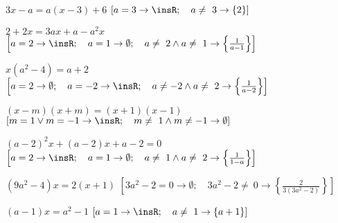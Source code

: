 \begin{esercizio}[\Ast]
\begin{enumeratea}
% 
 \item $3x-a=a(x-3)+6$
\hfill $\left[a=3 \rightarrow \insR; \quad a\neq~3 \rightarrow \{2\}\right]$
 \item $2+2x=3ax+a-a^{2}x$
\hfill $\left[a=2 \rightarrow \insR; \quad 
a=1 \rightarrow \emptyset; \quad 
a\neq~2\wedge a\neq~1 \rightarrow \left\{\frac{1}{a-1}\right\}\right]$
 \item $x(a^{2}-4)=a+2$
\hfill $\left[a=2 \rightarrow \emptyset; \quad 
a=-2 \rightarrow \insR; \quad 
a\neq -2\wedge a\neq~2 \rightarrow \left\{\frac{1}{a-2}\right\}\right]$
 \item $(x-m)(x+m)=(x+1)(x-1)$
\hfill $\left[m=1\vee m=-1 \rightarrow \insR; \quad 
m\neq~1\wedge m\neq -1 \rightarrow \emptyset\right]$
 \item $(a-2)^{2}x+(a-2)x+a-2=0$
\hfill $\left[a=2 \rightarrow \insR; \quad 
a=1 \rightarrow \emptyset; \quad 
a\neq~1\wedge a\neq~2 \rightarrow \left\{\frac{1}{1-a}\right\}\right]$
 \item $\left(9a^{2}-4\right)x=2(x+1)$
\hfill $\left[3a^{2}-2=0 \rightarrow \emptyset; \quad 
3a^{2}-2\neq~0 \rightarrow \left\{\frac{2}{3(3a^{2}-2)}\right\}\right]$
 \item $(a-1)x=a^{2}-1$
\hfill $\left[a=1 \rightarrow \insR; \quad 
a\neq~1 \rightarrow \{a+1\}\right]$

\end{enumeratea}
\end{esercizio}
